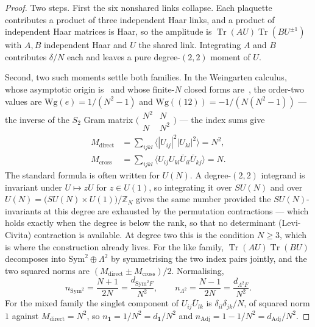 \documentclass[11pt]{article}
\theoremstyle{plain}
\theoremstyle{definition}
\theoremstyle{remark}
\newcommand{\chk}[1]{}
\begin{document}
\begin{proof}
Two steps. First the six nonshared links collapse. Each plaquette contributes
a product of three independent Haar links, and a product of independent Haar
matrices is Haar, so the amplitude is
$\operatorname{Tr}(AU)\operatorname{Tr}(BU^{\pm1})$ with $A,B$ independent
Haar and $U$ the shared link. Integrating $A$ and $B$ contributes
$\delta/N$ each and leaves a pure degree-$(2,2)$ moment of $U$.

Second, two such moments settle both families. In the Weingarten calculus,
whose asymptotic origin is~\cite{Weingarten1978} and whose finite-$N$ closed
forms are~\cite{CollinsSniady2006}, the order-two values are
$\mathrm{Wg}(e)=1/(N^2-1)$ and
$\mathrm{Wg}((12))=-1/(N(N^2-1))$ --- the inverse of the $S_2$ Gram matrix
$\bigl(\begin{smallmatrix}N^2&N\\N&N^2\end{smallmatrix}\bigr)$ --- the index
sums give
\begin{equation}\label{eq:moments}
  \begin{aligned}
    M_{\mathrm{direct}}&=\sum_{ijkl}\bigl\langle|U_{ij}|^2|U_{kl}|^2\bigr\rangle=N^2,\\
    M_{\mathrm{cross}}&=\sum_{ijkl}\bigl\langle U_{ij}U_{kl}\bar U_{il}\bar U_{kj}\bigr\rangle=N .
  \end{aligned}
\end{equation}
The standard formula is often written for $U(N)$. A degree-$(2,2)$ integrand
is invariant under $U\mapsto zU$ for $z\in U(1)$, so integrating it over
$SU(N)$ and over $U(N)=\bigl(SU(N)\times U(1)\bigr)/\mathbb Z_N$ gives the
same number provided the $SU(N)$-invariants at this degree are exhausted by
the permutation contractions --- which holds exactly when the degree is below
the rank, so that no determinant (Levi-Civita) contraction is available. At
degree two this is the condition $N\ge3$, which is where the construction
already lives.
For the like family, $\operatorname{Tr}(AU)\operatorname{Tr}(BU)$ decomposes
into $\mathrm{Sym}^2\oplus\Lambda^2$ by symmetrising the two index pairs
jointly, and the two squared norms are
$(M_{\mathrm{direct}}\pm M_{\mathrm{cross}})/2$. Normalising,
\[
  n_{\mathrm{Sym}^2}=\frac{N+1}{2N}=\frac{d_{\mathrm{Sym}^2F}}{N^2},
  \qquad
  n_{\Lambda^2}=\frac{N-1}{2N}=\frac{d_{\Lambda^2F}}{N^2}.
\]
For the mixed family the singlet component of $U_{ij}\bar U_{lk}$ is
$\delta_{il}\delta_{jk}/N$, of squared norm $1$ against
$M_{\mathrm{direct}}=N^2$, so $n_{\mathbf 1}=1/N^2=d_{\mathbf 1}/N^2$ and
$n_{\mathrm{Adj}}=1-1/N^2=d_{\mathrm{Adj}}/N^2$.
\end{proof}
\chk{the shared-link weights are Weingarten, not an isotropy assumption}
\end{document}
